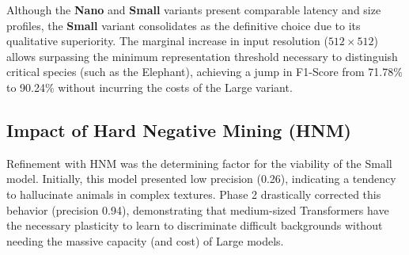 Although the \textbf{Nano} and \textbf{Small} variants present comparable latency and size profiles, the \textbf{Small} variant consolidates as the definitive choice due to its qualitative superiority. The marginal increase in input resolution ($512 \times 512$) allows surpassing the minimum representation threshold necessary to distinguish critical species (such as the Elephant), achieving a jump in F1-Score from 71.78\% to 90.24\% without incurring the costs of the Large variant.


\subsection{Impact of Hard Negative Mining (HNM)}

Refinement with HNM was the determining factor for the viability of the Small model. Initially, this model presented low precision (0.26), indicating a tendency to hallucinate animals in complex textures. Phase 2 drastically corrected this behavior (precision 0.94), demonstrating that medium-sized Transformers have the necessary plasticity to learn to discriminate difficult backgrounds without needing the massive capacity (and cost) of Large models.

